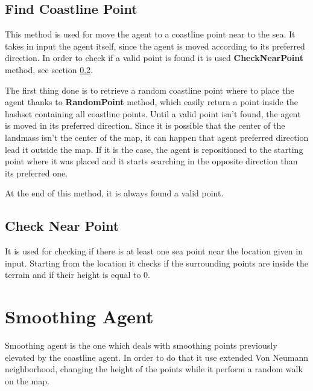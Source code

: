 \documentclass[12pt]{article}
\begin{document}
    \subsection{Find Coastline Point} \label{coastline:FindCoastlinePoint}
    This method is used for move the agent to a coastline point near to the sea. It takes in input the agent itself, since the agent is moved according to its preferred
    direction. In order to check if a valid point is found it is used \textbf{CheckNearPoint} method, see section \ref{coastline:CheckNearPoint}.

    The first thing done is to retrieve a random coastline point where to place the agent thanks to \textbf{RandomPoint} method, which easily return a point inside the hashset containing all 
    coastline points. Until a valid point isn't found, the agent is moved in its preferred direction.  Since it is possible that the center of the landmass isn't the center
    of the map, it can happen that agent preferred direction lead it outside the map. If it is the case, the agent is repositioned to the starting point where it was placed and 
    it starts searching in the opposite direction than its preferred one.

    At the end of this method, it is always found a valid point.

    \subsection{Check Near Point} \label{coastline:CheckNearPoint}
    It is used for checking if there is at least one sea point near the location given in input. Starting from the location it checks if the surrounding points are inside
    the terrain and if their height is equal to 0.

    \section{Smoothing Agent}
    Smoothing agent is the one which deals with smoothing points previously elevated by the coastline agent.
    In order to do that it use extended Von Neumann neighborhood, changing the height of the points while it perform a random walk 
    on the map.
    
\end{document}
